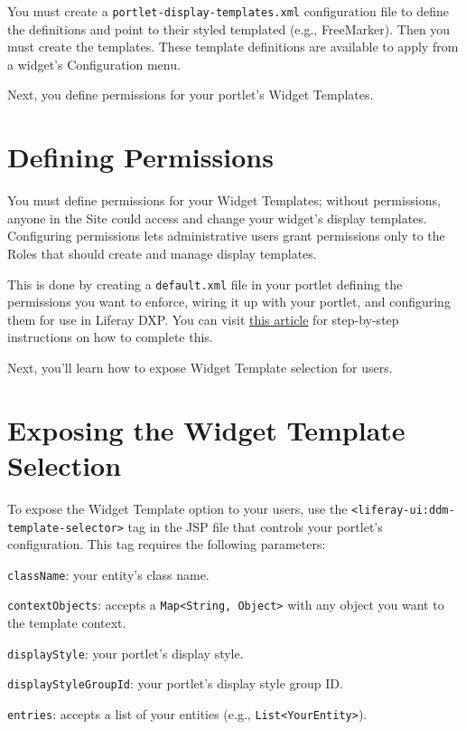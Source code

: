 You must create a \texttt{portlet-display-templates.xml} configuration
file to define the definitions and point to their styled templated
(e.g., FreeMarker). Then you must create the templates. These template
definitions are available to apply from a widget's Configuration menu.

Next, you define permissions for your portlet's Widget Templates.

\section{Defining Permissions}\label{defining-permissions}

You must define permissions for your Widget Templates; without
permissions, anyone in the Site could access and change your widget's
display templates. Configuring permissions lets administrative users
grant permissions only to the Roles that should create and manage
display templates.

This is done by creating a \texttt{default.xml} file in your portlet
defining the permissions you want to enforce, wiring it up with your
portlet, and configuring them for use in Liferay DXP. You can visit
\href{/docs/7-2/customization/-/knowledge_base/c/implementing-widget-templates}{this
article} for step-by-step instructions on how to complete this.

Next, you'll learn how to expose Widget Template selection for users.

\section{Exposing the Widget Template
Selection}\label{exposing-the-widget-template-selection}

To expose the Widget Template option to your users, use the
\texttt{\textless{}liferay-ui:ddm-template-selector\textgreater{}} tag
in the JSP file that controls your portlet's configuration. This tag
requires the following parameters:

\texttt{className}: your entity's class name.

\texttt{contextObjects}: accepts a
\texttt{Map\textless{}String,\ Object\textgreater{}} with any object you
want to the template context.

\texttt{displayStyle}: your portlet's display style.

\texttt{displayStyleGroupId}: your portlet's display style group ID.

\texttt{entries}: accepts a list of your entities (e.g.,
\texttt{List\textless{}YourEntity\textgreater{}}).

